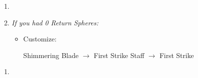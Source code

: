 \begin{spheregrid}
\begin{itemize}
\begin{itemize}
        \end{itemize}
    \end{itemize}
\end{spheregrid}
\bothcb \wincb \losscb
\begin{enumerate}[resume]
    \item \formation{\tidus}{\auron}{\yuna}
    \item \textit{If you had 0 Return Spheres:}
        \begin{itemize}
            \item Customize:
                \begin{itemize}
                    \auronf Shimmering Blade $\rightarrow$ First Strike
                    \yunaf Staff $\rightarrow$ First Strike
                \end{itemize}
        \end{itemize}
\end{enumerate}
\begin{enumerate}[resume]
    \item {\large \save}
\end{enumerate}
